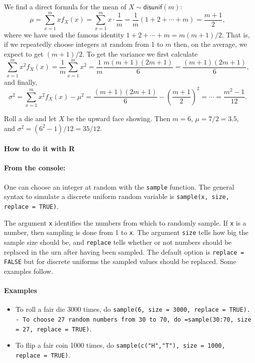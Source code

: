 \documentclass[captions=tableheading]{scrbook}
\begin{document}
We find a direct formula for the mean of \(X\sim\mathsf{disunif}(m)\):
\begin{equation}
\mu=\sum_{x=1}^{m}xf_{X}(x)=\sum_{x=1}^{m}x\cdot\frac{1}{m}=\frac{1}{m}(1+2+\cdots+m)=\frac{m+1}{2},
\end{equation}
where we have used the famous identity \(1+2+\cdots+m=m(m+1)/2\). That is, if we repeatedly choose integers at random from 1 to \(m\) then, on the average, we expect to get \((m+1)/2\). To get the variance we first calculate
\[
\sum_{x=1}^{m}x^{2}f_{X}(x)=\frac{1}{m}\sum_{x=1}^{m}x^{2}=\frac{1}{m}\frac{m(m+1)(2m+1)}{6}=\frac{(m+1)(2m+1)}{6},
\]
and finally,
\begin{equation}
\sigma^{2}=\sum_{x=1}^{m}x^{2}f_{X}(x)-\mu^{2}=\frac{(m+1)(2m+1)}{6}-\left(\frac{m+1}{2}\right)^{2}=\cdots=\frac{m^{2}-1}{12}.
\end{equation}

\begin{example}
Roll a die and let \(X\) be the upward face showing. Then \(m=6\), \(\mu=7/2=3.5\), and \(\sigma^{2}=(6^{2}-1)/12=35/12\).
\end{example}


\paragraph*{How to do it with \textsf{R}}


\paragraph*{From the console:}

One can choose an integer at random with the \texttt{sample} function. The general syntax to simulate a discrete uniform random variable is \texttt{sample(x, size, replace = TRUE)}.

The argument \texttt{x} identifies the numbers from which to randomly sample. If \texttt{x} is a number, then sampling is done from 1 to \texttt{x}. The argument \texttt{size} tells how big the sample size should be, and \texttt{replace} tells whether or not numbers should be replaced in the urn after having been sampled. The default option is \texttt{replace = FALSE} but for discrete uniforms the sampled values should be replaced. Some examples follow.

\paragraph*{Examples}
\begin{itemize}
\item To roll a fair die 3000 times, do \texttt{sample(6, size = 3000, replace = TRUE). - To choose 27 random numbers from 30 to 70, do =sample(30:70, size = 27, replace = TRUE)}.
\item To flip a fair coin 1000 times, do \texttt{sample(c("H","T"), size = 1000, replace = TRUE)}.
\end{itemize}
\end{document}

